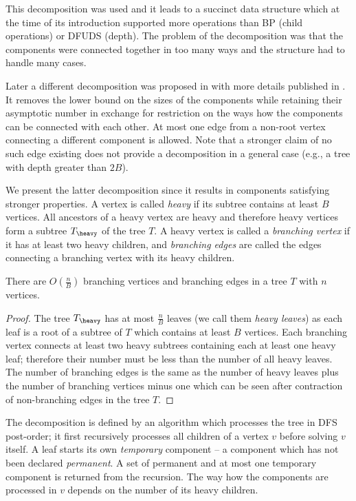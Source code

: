 This decomposition was used and it leads to a succinct data structure which at the time of its introduction supported more operations than BP (child operations) or DFUDS (depth).
The problem of the decomposition was that the components were connected together in too many ways and the structure had to handle many cases.

Later a different decomposition was proposed in \cite{farzan2008uniform} with more details published in \cite{farzan2014uniform}.
It removes the lower bound on the sizes of the components while retaining their asymptotic number in exchange for restriction on the ways how the components can be connected with each other.
At most one edge from a non-root vertex connecting a different component is allowed.
Note that a stronger claim of no such edge existing does not provide a decomposition in a general case (e.g., a tree with depth greater than $2 B$).

\bigbreak

We present the latter decomposition since it results in components satisfying stronger properties.
A vertex is called \emph{heavy} if its subtree contains at least $B$ vertices.
All ancestors of a heavy vertex are heavy and therefore heavy vertices form a subtree $T_{\heavy}$ of the tree $T$.
A heavy vertex is called a \emph{branching vertex} if it has at least two heavy children, and \emph{branching edges} are called the edges connecting a branching vertex with its heavy children.

\begin{lemma}\label{l:no-branching}
	There are $O\left(\frac{n}{B}\right)$ branching vertices and branching edges in a tree $T$ with $n$ vertices.
\end{lemma}
\begin{proof}
	The tree $T_{\heavy}$ has at most $\frac{n}{B}$ leaves (we call them \emph{heavy leaves}) as each leaf is a root of a subtree of $T$ which contains at least $B$ vertices.
	Each branching vertex connects at least two heavy subtrees containing each at least one heavy leaf; therefore their number must be less than the number of all heavy leaves.
	The number of branching edges is the same as the number of heavy leaves plus the number of branching vertices minus one which can be seen after contraction of non-branching edges in the tree $T$.
\end{proof}

The decomposition is defined by an algorithm which processes the tree in DFS post-order; it first recursively processes all children of a vertex $v$ before solving $v$ itself.
A leaf starts its own \emph{temporary} component -- a component which has not been declared \emph{permanent}.
A set of permanent and at most one temporary component is returned from the recursion.
The way how the components are processed in $v$ depends on the number of its heavy children.

